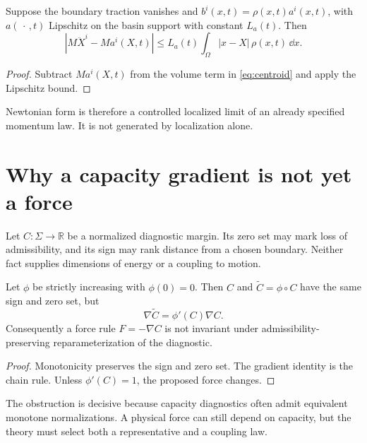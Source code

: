 \documentclass[11pt]{article}
\begin{document}
\begin{corollary}
\label{cor:narrow}
Suppose the boundary traction vanishes and
$b^i(x,t)=\rho(x,t)a^i(x,t)$, with $a(\,\cdot\,,t)$ Lipschitz on the basin
support with constant $L_a(t)$.  Then
\[
 \left|
 M\ddot X^i-Ma^i(X,t)
 \right|
 \leq
 L_a(t)\int_\Omega |x-X|\,\rho(x,t)\,\dd x.
\]
\end{corollary}

\begin{proof}
Subtract $Ma^i(X,t)$ from the volume term in
\cref{eq:centroid} and apply the Lipschitz bound.
\end{proof}

Newtonian form is therefore a controlled localized limit of an already
specified momentum law.  It is not generated by localization alone.

\section{Why a capacity gradient is not yet a force}

Let $C:\Sigma\to\mathbb{R}$ be a normalized diagnostic margin.  Its zero set
may mark loss of admissibility, and its sign may rank distance from a chosen
boundary.  Neither fact supplies dimensions of energy or a coupling to
motion.

\begin{proposition}\label{prop:reparam}
Let $\phi$ be strictly increasing with $\phi(0)=0$.  Then $C$ and
$\widetilde C=\phi\circ C$ have the same sign and zero set, but
\[
 \nabla\widetilde C=\phi'(C)\nabla C.
\]
Consequently a force rule $F=-\nabla C$ is not invariant under admissibility-
preserving reparameterization of the diagnostic.
\end{proposition}

\begin{proof}
Monotonicity preserves the sign and zero set.  The gradient identity is the
chain rule.  Unless $\phi'(C)=1$, the proposed force changes.
\end{proof}

The obstruction is decisive because capacity diagnostics often admit
equivalent monotone normalizations.  A physical force can still depend on
capacity, but the theory must select both a representative and a coupling law.
\end{document}
